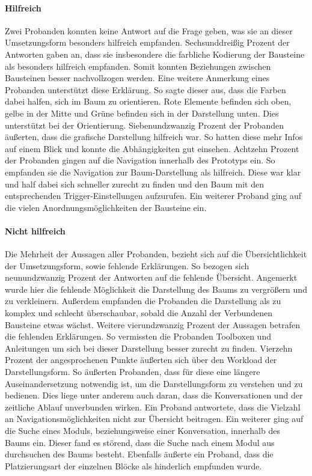 \paragraph{Hilfreich}Zwei Probanden konnten keine Antwort auf die Frage geben, was sie an dieser Umsetzungsform besonders hilfreich empfanden. Sechsunddreißig Prozent der Antworten gaben an, dass sie insbesondere die farbliche Kodierung der Bausteine als besonders hilfreich empfanden. Somit konnten Beziehungen zwischen Bausteinen besser nachvollzogen werden. Eine weitere Anmerkung eines Probanden unterstützt diese Erklärung. So sagte dieser aus, dass die Farben dabei halfen, sich im Baum zu orientieren. Rote Elemente befinden sich oben, gelbe in der Mitte und Grüne befinden sich in der Darstellung unten. Dies unterstützt bei der Orientierung. Siebenundzwanzig Prozent der Probanden äußerten, dass die grafische Darstellung hilfreich war. So hatten diese mehr Infos auf einem Blick und konnte die Abhängigkeiten gut einsehen. Achtzehn Prozent der Probanden gingen auf die Navigation innerhalb des Prototyps ein. So empfanden sie die Navigation zur Baum-Darstellung als hilfreich. Diese war klar und half dabei sich schneller zurecht zu finden und den Baum mit den entsprechenden Trigger-Einstellungen aufzurufen. Ein weiterer Proband ging auf die vielen Anordnungsmöglichkeiten der Bausteine ein. 


\paragraph{Nicht hilfreich}Die Mehrheit der Aussagen aller Probanden, bezieht sich auf die Übersichtlichkeit der Umsetzungsform, sowie fehlende Erklärungen. So bezogen sich neunundzwanzig Prozent der Antworten auf die fehlende Übersicht. Angemerkt wurde hier die fehlende Möglichkeit die Darstellung des Baums zu vergrößern und zu verkleinern. Außerdem empfanden die Probanden die Darstellung als zu komplex und schlecht überschaubar, sobald die Anzahl der Verbundenen Bausteine etwas wächst. Weitere vierundzwanzig Prozent der Aussagen betrafen die fehlenden Erklärungen. So vermissten die Probanden Toolboxen und Anleitungen um sich bei dieser Darstellung besser zurecht zu finden. Vierzehn Prozent der angesprochenen Punkte äußerten sich über den Workload der Darstellungsform. So äußerten Probanden, dass für diese eine längere Auseinandersetzung notwendig ist, um die Darstellungsform zu verstehen und zu bedienen. Dies liege unter anderem auch daran, dass die Konversationen und der zeitliche Ablauf unverbunden wirken. Ein Proband antwortete, dass die Vielzahl an Navigationsmöglichkeiten nicht zur Übersicht beitragen. Ein weiterer ging auf die Suche eines Moduls, beziehungsweise einer Konversation, innerhalb des Baums ein. Dieser fand es störend, dass die Suche nach einem Modul aus durchsuchen des Baums besteht. Ebenfalls äußerte ein Proband, dass die Platzierungsart der einzelnen Blöcke als hinderlich empfunden wurde.

